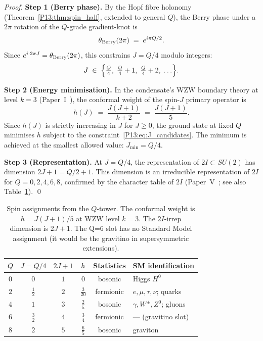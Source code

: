 \documentclass[11pt,a4paper]{article}
\theoremstyle{definition}
\theoremstyle{remark}
\begin{document}
\begin{proof}
\textbf{Step 1 (Berry phase).}
By the Hopf fibre holonomy (Theorem~\ref{P13:thm:spin_half}, extended to
general $Q$), the Berry phase under a $2\pi$ rotation of the $Q$-grade
gradient-knot is
\begin{equation}
  \theta_{\rm Berry}(2\pi) \;=\; e^{i\pi Q/2}.
  \label{P13:eq:berry_general}
\end{equation}
Since $e^{i\cdot 2\pi J} = \theta_{\rm Berry}(2\pi)$,
this constrains $J = Q/4$ modulo integers:
\begin{equation}
  J \;\in\; \Bigl\{\tfrac{Q}{4},\;\tfrac{Q}{4}+1,\;\tfrac{Q}{4}+2,\;\ldots\Bigr\}.
  \label{P13:eq:J_candidates}
\end{equation}

\textbf{Step 2 (Energy minimisation).}
In the condensate's WZW boundary theory at level $k=3$ (Paper~I~\cite{Paper1}),
the conformal weight of the spin-$J$ primary operator is
\begin{equation}
  h(J) \;=\; \frac{J(J+1)}{k+2} \;=\; \frac{J(J+1)}{5}.
  \label{P13:eq:conformal_weight}
\end{equation}
Since $h(J)$ is strictly increasing in $J$ for $J\ge0$, the ground state
at fixed $Q$ minimises $h$ subject to the constraint~\eqref{P13:eq:J_candidates}.
The minimum is achieved at the smallest allowed value:
$J_{\min} = Q/4$.

\textbf{Step 3 (Representation).}
At $J = Q/4$, the representation of $2I\subset SU(2)$ has dimension
$2J+1 = Q/2+1$.
This dimension is an irreducible representation of $2I$
for $Q = 0, 2, 4, 6, 8$, confirmed by the character table of $2I$
(Paper~V~\cite{Paper5}; see also Table~\ref{P13:tab:spin_assignments}).
\qed
\end{proof}

\begin{table}[h!]
\centering
\caption{Spin assignments from the $Q$-tower. The conformal weight
is $h = J(J+1)/5$ at WZW level $k=3$. The $2I$-irrep dimension is $2J+1$.
The Q=6 slot has no Standard Model assignment (it would be the gravitino
in supersymmetric extensions).}
\label{P13:tab:spin_assignments}
\begin{tabular}{cccccl}
\toprule
$Q$ & $J=Q/4$ & $2J+1$ & $h$ & Statistics & SM identification \\
\midrule
$0$ & $0$ & $1$ & $0$    & bosonic  & Higgs $H^0$ \\
$2$ & $\tfrac{1}{2}$ & $2$ & $\tfrac{3}{20}$ & fermionic & $e,\mu,\tau,\nu$; quarks \\
$4$ & $1$ & $3$ & $\tfrac{2}{5}$ & bosonic  & $\gamma,W^\pm,Z^0$; gluons \\
$6$ & $\tfrac{3}{2}$ & $4$ & $\tfrac{3}{4}$ & fermionic & --- (gravitino slot) \\
$8$ & $2$ & $5$ & $\tfrac{6}{5}$ & bosonic  & graviton \\
\bottomrule
\end{tabular}
\end{table}
\end{document}
